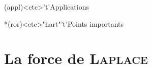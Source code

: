 \documentclass[../../main/main.tex]{subfiles}
\begin{document}
\begin{tcn}[sidebyside, fontupper=\small, fontlower=\small]
	\begin{tcn}(appl)<ctc>'t'{Applications}
	\end{tcn}
	\begin{tcn}*(ror)<ctc>"hart"'t'{Points importants}
	\end{tcn}
\end{tcn}

\vspace*{\fill}
\newpage

\section{La force de \textsc{Laplace}}
\label{sec:flpl}
\end{document}
